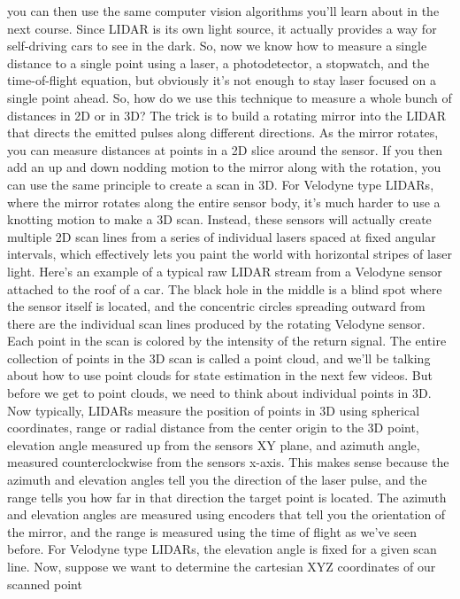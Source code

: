 you can then use the same computer vision algorithms you'll
learn about in the next course. Since LIDAR is its own light source, it actually provides a way for
self-driving cars to see in the dark. So, now we know how to
measure a single distance to a single point using
a laser, a photodetector, a stopwatch, and
the time-of-flight equation, but obviously it's not enough to stay laser focused on a single point ahead. So, how do we use
this technique to measure a whole bunch of
distances in 2D or in 3D? The trick is to build
a rotating mirror into the LIDAR that directs the emitted pulses
along different directions. As the mirror rotates, you can measure distances at points
in a 2D slice around the sensor. If you then add an up
and down nodding motion to the mirror along with the rotation, you can use the same principle
to create a scan in 3D. For Velodyne type LIDARs, where the mirror rotates
along the entire sensor body, it's much harder to use
a knotting motion to make a 3D scan. Instead, these sensors
will actually create multiple 2D scan lines from a series of individual lasers spaced at
fixed angular intervals, which effectively lets you paint the world with horizontal
stripes of laser light. Here's an example of
a typical raw LIDAR stream from a Velodyne sensor
attached to the roof of a car. The black hole in the middle is a blind spot where the sensor
itself is located, and the concentric circles
spreading outward from there are the individual scan lines produced
by the rotating Velodyne sensor. Each point in the scan is colored by
the intensity of the return signal. The entire collection of points in
the 3D scan is called a point cloud, and we'll be talking about
how to use point clouds for state estimation in the next few videos. But before we get to point clouds, we need to think about
individual points in 3D. Now typically, LIDARs
measure the position of points in 3D using
spherical coordinates, range or radial distance from
the center origin to the 3D point, elevation angle measured up
from the sensors XY plane, and azimuth angle, measured
counterclockwise from the sensors x-axis. This makes sense because
the azimuth and elevation angles tell you the direction
of the laser pulse, and the range tells you how far in that direction
the target point is located. The azimuth and elevation angles
are measured using encoders that tell you
the orientation of the mirror, and the range is measured using the time
of flight as we've seen before. For Velodyne type LIDARs, the elevation angle is fixed
for a given scan line. Now, suppose we want to
determine the cartesian XYZ coordinates of our scanned point

